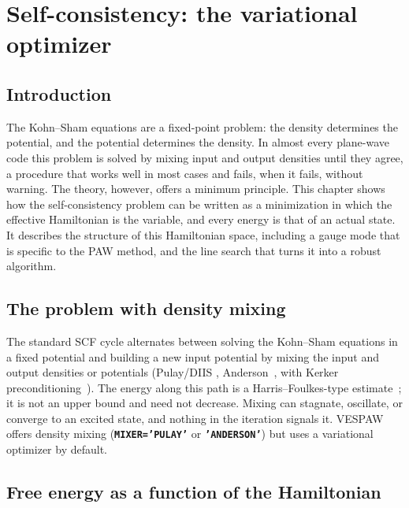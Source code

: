 \documentclass[11pt,a4paper,oneside]{book}
\newcommand{\key}[1]{\textbf{\texttt{#1}}}
\begin{document}
\chapter{Self-consistency: the variational optimizer}\label{chap:variational}
\minitoc
\section{Introduction}

The Kohn--Sham equations are a fixed-point problem: the density
determines the potential, and the potential determines the density. In
almost every plane-wave code this problem is solved by mixing input and
output densities until they agree, a procedure that works well in most
cases and fails, when it fails, without warning. The theory, however,
offers a minimum principle. This chapter shows how the self-consistency
problem can be written as a minimization in which the effective
Hamiltonian is the variable, and every energy is that of an actual
state. It describes the structure of this Hamiltonian space, including
a gauge mode that is specific to the PAW method, and the line search
that turns it into a robust algorithm.


\section{The problem with density mixing}

The standard SCF cycle alternates between solving the Kohn--Sham
equations in a fixed potential and building a new input potential by
mixing the input and output densities or potentials (Pulay/DIIS
\cite{Pulay1980}, Anderson~\cite{Anderson1965}, with Kerker
preconditioning~\cite{Kerker1981}). The energy along this path is a
Harris--Foulkes-type estimate~\cite{Harris1985,FoulkesHaydock1989}; it is
not an upper bound and need not decrease. Mixing can stagnate, oscillate,
or converge to an excited state, and nothing in the iteration signals
it. VESPAW offers density mixing (\key{MIXER='PULAY'} or
\key{'ANDERSON'}) but uses a variational optimizer by default.

\section{Free energy as a function of the Hamiltonian}\label{sec:route1}
\end{document}
